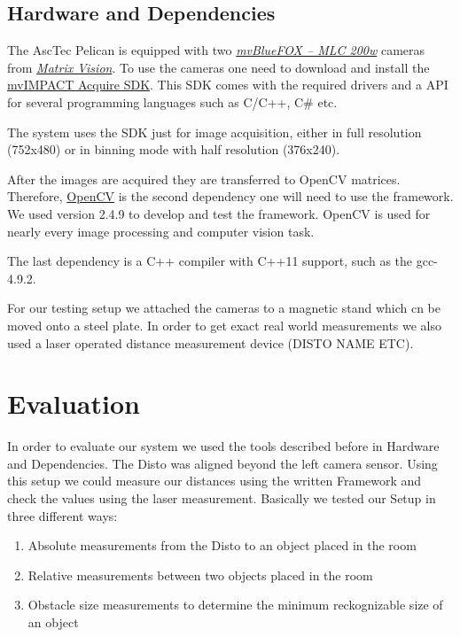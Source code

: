 \documentclass[11pt]{article}
\begin{document}
\subsection{Hardware and Dependencies}  
The AscTec Pelican is equipped with two  \emph{\href{http://www.matrix-vision.com/USB2.0-single-board-camera-mvbluefox-mlc.html?camera=mvBlueFOX-MLC200wC&selectInterface=Alle&selectMpixels=Alle&selectFps=Alle&selectSensor=Alle&selectColor=Alle&selectSize=Alle&selectShutter=Alle&selectModel=Alle&col=1&row=0}{mvBlueFOX -- MLC 200w}} cameras from \emph{\href{http://www.matrix-vision.com/home-en.html}{Matrix Vision}}. To use the cameras one need to download and install the \href{http://www.matrix-vision.com/programming-interface-mvimpact-acquire.html}{mvIMPACT Acquire SDK}. This SDK comes with the required drivers and a API for several programming languages such as C/C++, C\# etc. 

The system uses the SDK just for image acquisition, either in full resolution (752x480) or in binning mode with half resolution (376x240).

After the images are acquired they are transferred to OpenCV matrices. Therefore, \href{http://opencv.org/}{OpenCV} is the second dependency one will need to use the framework. We used version 2.4.9 to develop and test the framework. OpenCV is used for nearly every image processing and computer vision task.

The last dependency is a C++ compiler with C++11 support, such as the gcc-4.9.2.

For our testing setup we attached the cameras to a magnetic stand which cn be moved onto a steel plate. In order to get exact real world measurements we also used a laser operated distance measurement device (DISTO NAME ETC).

\section{Evaluation}
In order to evaluate our system we used the tools described before in Hardware and Dependencies. The Disto was aligned beyond the left camera sensor. Using this setup we could measure our distances using the written Framework and check the values using the laser measurement. Basically we tested our Setup in three different ways:

\begin{enumerate}
  \item Absolute measurements from the Disto to an object placed in the room
  \item Relative measurements between two objects placed in the room
  \item Obstacle size measurements to determine the minimum reckognizable size of an object
\end{enumerate}
\end{document}
